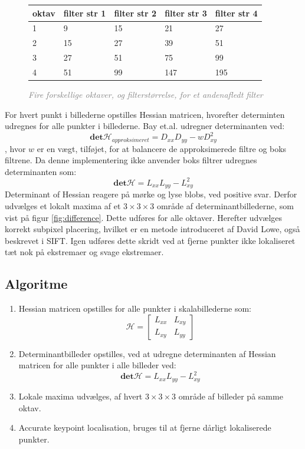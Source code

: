 \begin{figure}[H]
    \centering
    \begin{center}    
    \begin{tabular}{ | l | l | l | l | l |}
    \hline
    oktav & filter str 1 & filter str 2 & filter str 3 & filter str 4 \\ \hline
    1 & 9 & 15 & 21 & 27 \\ \hline
  	2 & 15 & 27 & 39 & 51 \\ \hline
  	3 & 27 & 51 & 75 & 99 \\ \hline
  	4 & 51 & 99 & 147 & 195 \\ \hline
    \end{tabular}       
    \caption{\textcolor{gray}{\footnotesize \textit{Fire forskellige oktaver, og filterstørrelse, for et andenafledt filter}}}
    \label{fig:secderivfiltersize}
     \end{center}
     \vspace{-2.5em}
  \end{figure} \noindent
For hvert punkt i billederne opstilles Hessian matricen, hvorefter determinten udregnes for alle punkter i billederne. Bay et.al. udregner determinanten ved:
\begin{equation}
\textbf{det}\mathcal{H}_{approksimeret} = D_{xx}D_{yy}-wD_{xy}^2
\label{deerminantofhessian}
\end{equation}
, hvor $w$ er en vægt, tilføjet, for at balancere de approksimerede filtre og boks filtrene. Da denne implementering ikke anvender boks filtrer udregnes determinanten som:
\begin{equation}
\textbf{det}\mathcal{H} = L_{xx}L_{yy}-L_{xy}^2
\label{deerminantofhessian}
\end{equation}
Determinant of Hessian reagere på mørke og lyse blobs, ved positive svar. Derfor udvælges et lokalt maxima af et $3\times3\times3$ område af determinantbillederne, som vist på figur \ref{fig:difference}. Dette udføres for alle oktaver. Herefter udvælges korrekt subpixel placering, hvilket er en metode introduceret af David Lowe, også beskrevet i SIFT. Igen udføres dette skridt ved at fjerne punkter ikke lokaliseret tæt nok på ekstremaer og svage ekstremaer.
\subsection*{Algoritme}
\begin{enumerate}
\item {Hessian matricen opstilles for alle punkter i skalabillederne som:
$$
\mathcal{H} = 
 \begin{bmatrix}
 	L_{xx} & L_{xy} \\
 	L_{xy} & L_{yy} 
 \end{bmatrix} $$
}
\item Determinantbilleder opstilles, ved at udregne determinanten af Hessian matricen for alle punkter i alle billeder ved:
$$
\textbf{det}\mathcal{H} = L_{xx}L_{yy}-L_{xy}^2
$$
\item Lokale maxima udvælges, af hvert $3\times3\times3$ område af billeder på samme oktav.
\item Accurate keypoint localisation, bruges til at fjerne dårligt lokaliserede punkter.
\end{enumerate}
